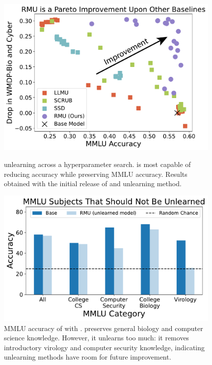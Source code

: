 \begin{figure}[t!]
    \centering
    \begin{minipage}[b]{0.48\textwidth}
    \includegraphics[width=0.98\textwidth]{figures/pareto.pdf}
    \caption{\zephyr{} unlearning across a hyperparameter search. \method{} is most capable of reducing \benchmark{} accuracy while preserving MMLU accuracy. Results obtained with the initial release of \benchmark{} and unlearning method.}
    \label{fig:pareto}
    \end{minipage}
    \hfill 
  \begin{minipage}[b]{0.49\textwidth}
  \includegraphics[width=0.98\textwidth]{figures/mmlu_zoomed_in.pdf}
\caption{MMLU accuracy of \zephyr{} with \method{}. \method{} preserves general biology and computer science knowledge. However, it unlearns too much: it removes introductory virology and computer security knowledge, indicating unlearning methods have room for future improvement.}
\label{fig:zoomed_in}
  \end{minipage}
\end{figure} 


